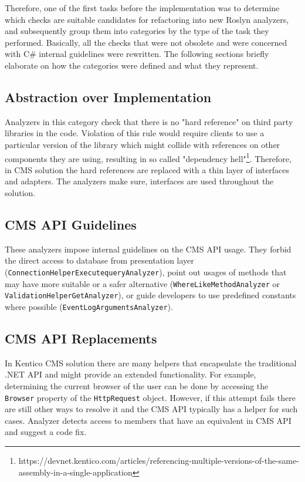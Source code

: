 \documentclass[
  digital, %
  table,   %
  lof,     %
  lot,     %
  oneside,
]{fithesis3}
\begin{document}
Therefore, one of the first tasks before the implementation was to determine which checks are suitable candidates for refactoring into new Roslyn analyzers, and subsequently group them into categories by the type of the task they performed. Basically, all the checks that were not obsolete and were concerned with C\# internal guidelines were rewritten. The following sections briefly elaborate on how the categories were defined and what they represent. 

\subsection{Abstraction over Implementation}
Analyzers in this category check that there is no "hard reference" on third party libraries in the code. Violation of this rule would require clients to use a particular version of the library which might collide with references on other components they are using, resulting in so called "dependency hell"\footnote{https://devnet.kentico.com/articles/referencing-multiple-versions-of-the-same-assembly-in-a-single-application}. Therefore, in CMS solution the hard references are replaced with a thin layer of interfaces and adapters. The analyzers make sure, interfaces are used throughout the solution.

\subsection{CMS API Guidelines}
These analyzers impose internal guidelines on the CMS API usage. They forbid the direct access to database from presentation layer (\texttt{ConnectionHelperExecutequeryAnalyzer}), point out usages of methods that may have more suitable or a safer alternative (\texttt{WhereLikeMethodAnalyzer} or \texttt{ValidationHelperGetAnalyzer}), or guide developers to use predefined constants where possible (\texttt{EventLogArgumentsAnalyzer}).

\subsection{CMS API Replacements}
In Kentico CMS solution there are many helpers that encapsulate the traditional .NET API and might provide an extended functionality. For example, determining the current browser of the user can be done by accessing the \texttt{Browser} property of the \texttt{HttpRequest} object. However, if this attempt fails there are still other ways to resolve it and the CMS API typically has a helper for such cases. Analyzer detects access to members that have an equivalent in CMS API and suggest a code fix. 
\end{document}
